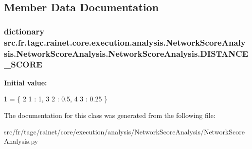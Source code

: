 \subsection{Member Data Documentation}
\hypertarget{classsrc_1_1fr_1_1tagc_1_1rainet_1_1core_1_1execution_1_1analysis_1_1NetworkScoreAnalysis_1_1Netb8ffb1b7ba97f5d739cfb51f5ce47153_a13d4d3bff64e807f9a8427f0d437ddd2}{
\subsubsection[{D\-I\-S\-T\-A\-N\-C\-E\-\_\-\-S\-C\-O\-R\-E}]{\setlength{\rightskip}{0pt plus 5cm}dictionary src.\-fr.\-tagc.\-rainet.\-core.\-execution.\-analysis.\-Network\-Score\-Analysis.\-Network\-Score\-Analysis.\-Network\-Score\-Analysis.\-D\-I\-S\-T\-A\-N\-C\-E\-\_\-\-S\-C\-O\-R\-E\hspace{0.3cm}{\ttfamily [static]}}}\label{classsrc_1_1fr_1_1tagc_1_1rainet_1_1core_1_1execution_1_1analysis_1_1NetworkScoreAnalysis_1_1Netb8ffb1b7ba97f5d739cfb51f5ce47153_a13d4d3bff64e807f9a8427f0d437ddd2}
{\bfseries Initial value\-:}
\begin{DoxyCode}
1 = \{
2                       1 : 1,
3                       2 : 0.5,
4                       3 : 0.25 \}
\end{DoxyCode}


The documentation for this class was generated from the following file\-:\begin{DoxyCompactItemize}
\item 
src/fr/tagc/rainet/core/execution/analysis/\-Network\-Score\-Analysis/Network\-Score\-Analysis.\-py\end{DoxyCompactItemize}
